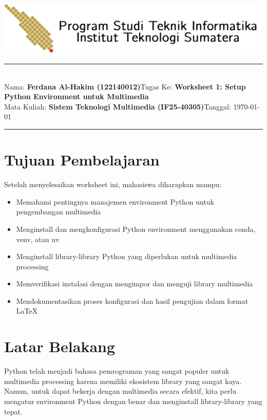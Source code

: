 \documentclass[11pt,a4paper]{article}
\newcommand{\student}{\textbf{Ferdana Al-Hakim (122140012)}}
\newcommand{\course}{\textbf{Sistem Teknologi Multimedia (IF25-40305)}}
\newcommand{\assignment}{\textbf{Worksheet 1: Setup Python Environment untuk Multimedia}}
\begin{document}
\thispagestyle{empty}
\begin{center}
	\includegraphics[scale = 0.15]{figure/ifitera-header.png}
	\vspace{0.1cm}
\end{center}
\noindent
\rule{17cm}{0.2cm}\\[0.3cm]
Nama: \student \hfill Tugas Ke: \assignment\\[0.1cm]
Mata Kuliah: \course \hfill Tanggal: \today\\
\rule{17cm}{0.05cm}
\vspace{0.1cm}



\section{Tujuan Pembelajaran}
Setelah menyelesaikan worksheet ini, mahasiswa diharapkan mampu:
\begin{itemize}
    \item Memahami pentingnya manajemen environment Python untuk pengembangan multimedia
    \item Menginstall dan mengkonfigurasi Python environment menggunakan conda, venv, atau uv
    \item Menginstall library-library Python yang diperlukan untuk multimedia processing
    \item Memverifikasi instalasi dengan mengimpor dan menguji library multimedia
    \item Mendokumentasikan proses konfigurasi dan hasil pengujian dalam format \LaTeX
\end{itemize}

\section{Latar Belakang}
Python telah menjadi bahasa pemrograman yang sangat populer untuk multimedia processing karena memiliki ekosistem library yang sangat kaya. Namun, untuk dapat bekerja dengan multimedia secara efektif, kita perlu mengatur environment Python dengan benar dan menginstall library-library yang tepat.
\end{document}
